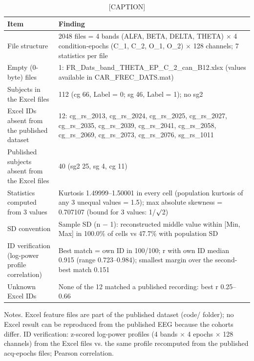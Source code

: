 \begin{table}[htbp]
\centering
\caption{[CAPTION]}
\label{tab:TableS5}
\footnotesize
\begin{tabular}{p{3.5cm}p{11.3cm}}
\toprule
Item & Finding \\
\midrule
File structure & 2048 files = 4 bands (ALFA, BETA, DELTA, THETA) $\times$ 4 condition-epochs (C\_1, C\_2, O\_1, O\_2) $\times$ 128 channels; 7 statistics per file \\
Empty (0-byte) files & 1: FR\_Dats\_band\_THETA\_EP\_C\_2\_can\_B12.xlsx (values available in CAR\_FREC\_DATS.mat) \\
Subjects in the Excel files & 112 (cg 66, Label = 0; sg 46, Label = 1); no sg2 \\
Excel IDs absent from the published dataset & 12: cg\_rs\_2013, cg\_rs\_2024, cg\_rs\_2025, cg\_rs\_2027, cg\_rs\_2035, cg\_rs\_2039, cg\_rs\_2041, cg\_rs\_2058, cg\_rs\_2069, cg\_rs\_2073, cg\_rs\_2076, sg\_rs\_1011 \\
Published subjects absent from the Excel files & 40 (sg2 25, sg 4, cg 11) \\
Statistics computed from 3 values & Kurtosis 1.49999--1.50001 in every cell (population kurtosis of any 3 unequal values = 1.5); max absolute skewness = 0.707107 (bound for 3 values: 1/$\surd$2) \\
SD convention & Sample SD (n $-$ 1): reconstructed middle value within [Min, Max] in 100.0\% of cells vs 47.7\% with population SD \\
ID verification (log-power profile correlation) & Best match = own ID in 100/100; r with own ID median 0.915 (range 0.723--0.984); smallest margin over the second-best match 0.151 \\
Unknown Excel IDs & None of the 12 matched a published recording: best r 0.25--0.66 \\
\bottomrule
\end{tabular}
\par\smallskip
\begin{minipage}{\textwidth}\raggedright\scriptsize
Notes. Excel feature files are part of the published dataset (code/ folder); no Excel result can be reproduced from the published EEG because the cohorts differ. ID verification: z-scored log-power profiles (4 bands $\times$ 4 epochs $\times$ 128 channels) from the Excel files vs. the same profile recomputed from the published acq-epochs files; Pearson correlation.
\end{minipage}
\end{table}
